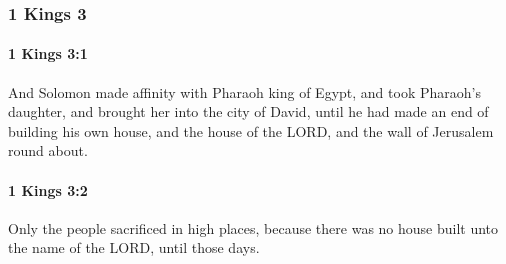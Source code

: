 	\subsubsection{1 Kings 3} %
		\label{1KINGS-3}

		\paragraph{1 Kings 3:1} %
			\label{1KINGS-3-1}

			And Solomon made affinity with Pharaoh king of Egypt, and took Pharaoh’s daughter, and brought her into the city of David, until he had made an end of building his own house, and the house of the LORD, and the wall of Jerusalem round about.


		\paragraph{1 Kings 3:2} %
			\label{1KINGS-3-2}

			Only the people sacrificed in high places, because there was no house built unto the name of the LORD, until those days.

